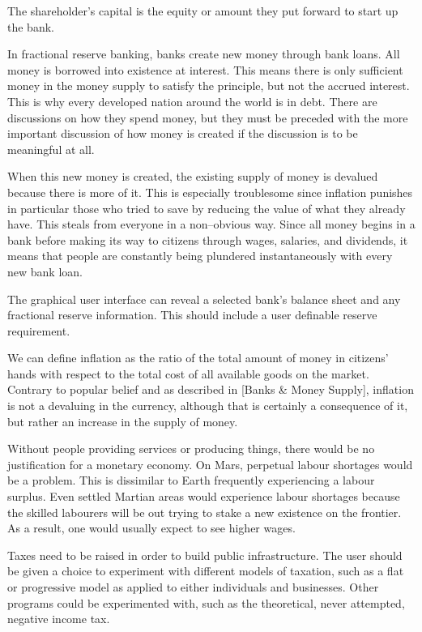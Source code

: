 The shareholder's capital is the equity or amount they put forward to start up the bank.

In fractional reserve banking, banks create new money through bank loans. All money is borrowed into existence at interest. This means there is only sufficient money in the money supply to satisfy the principle, but not the accrued interest. This is why every developed nation around the world is in debt. There are discussions on how they spend money, but they must be preceded with the more important discussion of how money is created if the discussion is to be meaningful at all.

When this new money is created, the existing supply of money is devalued because there is more of it. This is especially troublesome since inflation punishes in particular those who tried to save by reducing the value of what they already have. This steals from everyone in a non--obvious way. Since all money begins in a bank before making its way to citizens through wages, salaries, and dividends, it means that people are constantly being plundered instantaneously with every new bank loan.

The graphical user interface can reveal a selected bank's balance sheet and any fractional reserve information. This should include a user definable reserve requirement.

We can define inflation as the ratio of the total amount of money in citizens' hands with respect to the total cost of all available goods on the market. Contrary to popular belief and as described in [Banks & Money Supply], inflation is not a devaluing in the currency, although that is certainly a consequence of it, but rather an increase in the supply of money. 

Without people providing services or producing things, there would be no justification for a monetary economy. On Mars, perpetual labour shortages would be a problem. This is dissimilar to Earth frequently experiencing a labour surplus. Even settled Martian areas would experience labour shortages because the skilled labourers will be out trying to stake a new existence on the frontier. As a result, one would usually expect to see higher wages.

Taxes need to be raised in order to build public infrastructure. The user should be given a choice to experiment with different models of taxation, such as a flat or progressive model as applied to either individuals and businesses. Other programs could be experimented with, such as the theoretical, never attempted, negative income tax.

